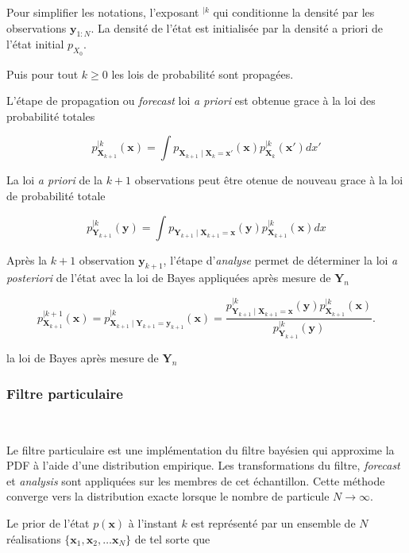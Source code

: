 Pour simplifier les notations, l'exposant $^{\mid k}$ qui conditionne la densité par les observations $\bm y_{1:N}$.
La densité de l'état est initialisée par la densité a priori de l'état initial $p_{X_0}$.

Puis pour tout $k \geq 0$ les lois de probabilité sont propagées.

L'étape de propagation ou \textit{forecast} loi \textit{a priori} est obtenue grace à la loi des probabilité totales

\begin{equation}\label{tot_rule}
    p_{\bm X_{k+1}}^{\mid k}(\bm x)= \int p_{\bm X_{k+1}\mid \bm X_{k} = \bm x'}(\bm x) p_{\bm X_{k}}^{\mid k}(\bm x')dx'
\end{equation}

La loi \textit{a priori} de la $k+1$ observations peut être otenue de nouveau grace à la loi de probabilité totale

\begin{equation*}
    p_{\bm Y_{k+1}}^{\mid k}(\bm y) = \int p_{\bm Y_{k+1}\mid \bm X_{k+1} = \bm x}(\bm y) p_{\bm X_{k+1}}^{\mid k}(\bm x)dx
\end{equation*}

Après la $k+1$ observation $\bm y_{k+1}$, l'étape d'\textit{analyse} permet de déterminer la loi \textit{a posteriori} de l'état
avec la loi de Bayes appliquées après mesure de $\bm Y_n$

\begin{equation*}
    p_{\bm X_{k+1}}^{\mid k+1}(\bm x) = p_{\bm X_{k+1} \mid \bm Y_{k+1} = \bm y_{k+1}}^{\mid k}(\bm x) = \frac{p_{\bm Y_{k+1} \mid \bm X_{k+1} = \bm x}^{\mid k}(\bm y) p_{\bm X_{k+1}}^{\mid k}(\bm x) }{p_{\bm Y_{k+1}}^{\mid k}(\bm y)}.
\end{equation*}


la loi de Bayes après mesure de $\bm Y_n$

\subsubsection{Filtre particulaire}~\label{filtre_particulaire}

Le filtre particulaire est une implémentation du filtre bayésien qui approxime la PDF à l'aide d'une distribution empirique. Les transformations du filtre, \textit{forecast} et \textit{analysis} sont appliquées sur les membres de cet échantillon.
Cette méthode converge vers la distribution exacte lorsque le nombre de particule $N \to \infty$.

Le prior de l'état $p(\bm x)$ à l'instant $k$ est représenté par un ensemble de $N$ réalisations $\{\bm x_1, \bm x_2, \dots \bm x_N\}$ de tel sorte que

